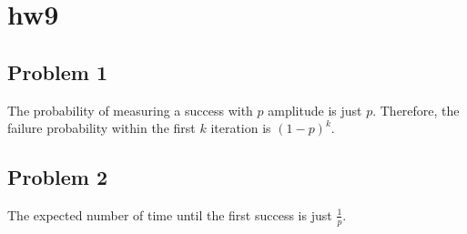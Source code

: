 \documentclass{article}%
\begin{document}
\section*{hw9}

\subsection*{Problem 1}

The probability of measuring a success with $p$ amplitude is just $p$.
Therefore, the failure probability within the first $k$ iteration is $(1-p)^k$.

\subsection*{Problem 2}

The expected number of time until the first success is just $\frac{1}{p}$.
\end{document}
